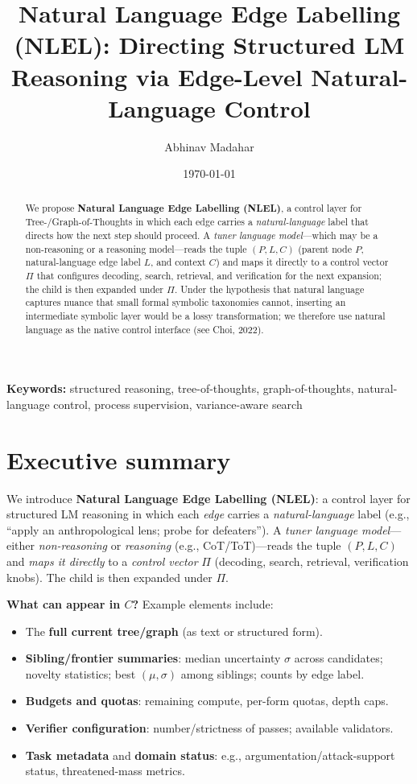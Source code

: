 \documentclass[11pt]{article}
\title{\vspace{-1.0em}\textbf{Natural Language Edge Labelling (NLEL): Directing Structured LM Reasoning via Edge-Level Natural-Language Control}}
\author{Abhinav Madahar}
\date{\today}
\begin{document}
\maketitle

\begin{abstract}
We propose \textbf{Natural Language Edge Labelling (NLEL)}, a control layer for Tree-/Graph-of-Thoughts in which each edge carries a \emph{natural-language} label that directs how the next step should proceed. A \emph{tuner language model}---which may be a non-reasoning or a reasoning model---reads the tuple $(P,L,C)$ (parent node $P$, natural-language edge label $L$, and context $C$) and maps it directly to a control vector $\Pi$ that configures decoding, search, retrieval, and verification for the next expansion; the child is then expanded under $\Pi$. Under the hypothesis that natural language captures nuance that small formal symbolic taxonomies cannot, inserting an intermediate symbolic layer would be a lossy transformation; we therefore use natural language as the native control interface (see Choi, 2022).
\end{abstract}

\noindent\textbf{Keywords:} structured reasoning, tree-of-thoughts, graph-of-thoughts, natural-language control, process supervision, variance-aware search

\section{Executive summary}
We introduce \textbf{Natural Language Edge Labelling (NLEL)}: a control layer for structured LM reasoning in which each \emph{edge} carries a \emph{natural-language} label (e.g., ``apply an anthropological lens; probe for defeaters''). A \emph{tuner language model}---either \emph{non-reasoning} or \emph{reasoning} (e.g., CoT/ToT)---reads the tuple $(P,L,C)$ and \emph{maps it directly} to a \emph{control vector} $\Pi$ (decoding, search, retrieval, verification knobs). The child is then expanded under $\Pi$.

\medskip
\noindent\textbf{What can appear in $C$?} Example elements include:
\begin{itemize}[leftmargin=1.2em]
  \item The \textbf{full current tree/graph} (as text or structured form).
  \item \textbf{Sibling/frontier summaries}: median uncertainty $\sigma$ across candidates; novelty statistics; best $(\mu,\sigma)$ among siblings; counts by edge label.
  \item \textbf{Budgets and quotas}: remaining compute, per-form quotas, depth caps.
  \item \textbf{Verifier configuration}: number/strictness of passes; available validators.
  \item \textbf{Task metadata} and \textbf{domain status}: e.g., argumentation/attack-support status, threatened-mass metrics.
\end{itemize}
\end{document}
